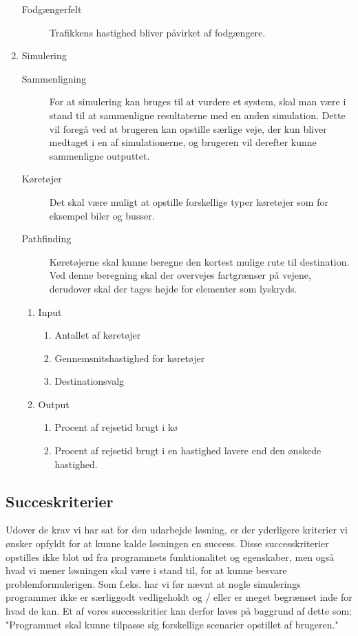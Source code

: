 \begin{enumerate}
\begin{description}
	\item [Fodgængerfelt] Trafikkens hastighed bliver påvirket af fodgængere.
	\end{description}
\item Simulering
    \begin{description}
    \item [Sammenligning] For at simulering kan bruges til at vurdere et system, skal man være i stand til at sammenligne resultaterne med en anden simulation. Dette vil foregå ved at brugeren kan opstille særlige veje, der kun bliver medtaget i en af simulationerne, og brugeren vil derefter kunne sammenligne outputtet.
    \item [Køretøjer] Det skal være muligt at opstille forskellige typer køretøjer som for eksempel biler og busser.
    \item [Pathfinding] Køretøjerne skal kunne beregne den kortest mulige rute til destination. Ved denne beregning skal der overvejes fartgrænser på vejene, derudover skal der tages højde for elementer som lyskryds.
    \end{description}
    \begin{enumerate}
    \item Input
        \begin{enumerate}
        \item Antallet af køretøjer
        \item Gennemsnitshastighed for køretøjer
        \item Destinationsvalg
        \end{enumerate}
    \item Output
        \begin{enumerate}
        \item Procent af rejsetid brugt i kø
        \item Procent af rejsetid brugt i en hastighed lavere end den ønskede hastighed.
        \end{enumerate}
    \end{enumerate}
\end{enumerate}

\subsection{Succeskriterier}\label{Succeskriterier}
Udover de krav vi har sat for den udarbejde løsning, er der yderligere kriterier vi ønsker opfyldt for at kunne kalde løsningen en success. Disse successkriterier opstilles ikke blot ud fra programmets funktionalitet og egenskaber, men også hvad vi mener løsningen skal være i stand til, for at kunne besvare problemformulerigen. Som f.eks. har vi før nævnt at nogle simulerings programmer ikke er særliggodt vedligeholdt og / eller er meget begrænset inde for hvad de kan. Et af vores successkritier kan derfor laves på baggrund af dette som: "Programmet skal kunne tilpasse sig forskellige scenarier opstillet af brugeren."

